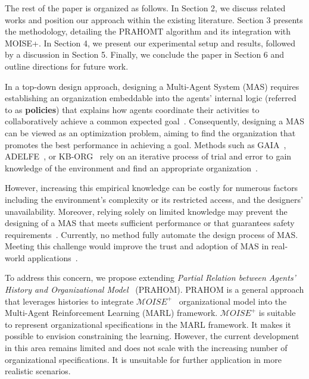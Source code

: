 \documentclass[sigconf,anonymous]{aamas}
\begin{document}
The rest of the paper is organized as follows. In Section 2, we discuss related works and position our approach within the existing literature. Section 3 presents the methodology, detailing the PRAHOMT algorithm and its integration with MOISE+. In Section 4, we present our experimental setup and results, followed by a discussion in Section 5. Finally, we conclude the paper in Section 6 and outline directions for future work.


\nocite{Kott2023}

In a top-down design approach, designing a Multi-Agent System (MAS) requires establishing an organization embeddable into the agents' internal logic (referred to as \textbf{policies}) that explains how agents coordinate their activities to collaboratively achieve a common expected goal~\cite{Picard2009}.
%
Consequently, designing a MAS can be viewed as an optimization problem, aiming to find the organization that promotes the best performance in achieving a goal. Methods such as GAIA~\cite{Wooldridge2000,Cernuzzi2014}, ADELFE~\cite{Mefteh2015}, or KB-ORG~\cite{Sims2008} rely on an iterative process of trial and error to gain knowledge of the environment and find an appropriate organization~\cite{Sims2008}.

However, increasing this empirical knowledge can be costly for numerous factors including the environment's complexity or its restricted access, and the designers' unavailability. Moreover, relying solely on limited knowledge may prevent the designing of a MAS that meets sufficient performance or that guarantees safety requirements~\cite{Mefteh2013}. Currently, no method fully automate the design process of MAS. Meeting this challenge would improve the trust and adoption of MAS in real-world applications~\cite{kok2006collaborative,omidshafiei2019learning}.

To address this concern, we propose extending \textit{Partial Relation between Agents' History and Organizational Model}~\cite{soule2024} (PRAHOM). PRAHOM is a general approach that leverages histories to integrate $\mathcal{M}OISE^+$~\cite{Hubner2007} organizational model into the Multi-Agent Reinforcement Learning (MARL) framework. $\mathcal{M}OISE^+$ is suitable to represent organizational specifications in the MARL framework. It makes it possible to envision constraining the learning. However, the current development in this area remains limited and does not scale with the increasing number of organizational specifications. It is unsuitable for further application in more realistic scenarios.
\end{document}
